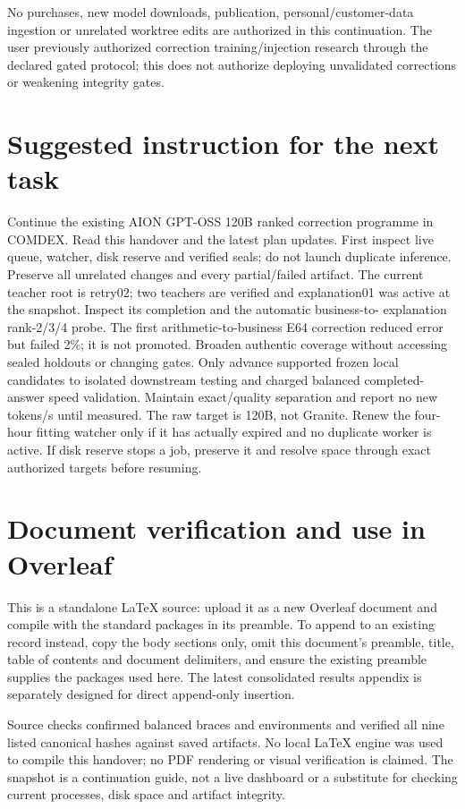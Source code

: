 \documentclass[11pt,a4paper]{article}
\begin{document}
No purchases, new model downloads, publication, personal/customer-data
ingestion or unrelated worktree edits are authorized in this continuation.
The user previously authorized correction training/injection research through
the declared gated protocol; this does not authorize deploying unvalidated
corrections or weakening integrity gates.

\section{Suggested instruction for the next task}
Continue the existing AION GPT-OSS 120B ranked correction programme in COMDEX.
Read this handover and the latest plan updates. First inspect live queue,
watcher, disk reserve and verified seals; do not launch duplicate inference.
Preserve all unrelated changes and every partial/failed artifact. The current
teacher root is retry02; two teachers are verified and explanation01 was
active at the snapshot. Inspect its completion and the automatic business-to-
explanation rank-2/3/4 probe. The first arithmetic-to-business E64 correction
reduced error but failed 2\%; it is not promoted. Broaden authentic coverage
without accessing sealed holdouts or changing gates. Only advance supported
frozen local candidates to isolated downstream testing and charged balanced
completed-answer speed validation. Maintain exact/quality separation and
report no new tokens/s until measured. The raw target is 120B, not Granite.
Renew the four-hour fitting watcher only if it has actually expired and no
duplicate worker is active. If disk reserve stops a job, preserve it and
resolve space through exact authorized targets before resuming.

\section{Document verification and use in Overleaf}
This is a standalone LaTeX source: upload it as a new Overleaf document and
compile with the standard packages in its preamble. To append to an existing
record instead, copy the body sections only, omit this document's preamble,
title, table of contents and document delimiters, and ensure the existing
preamble supplies the packages used here. The latest consolidated results
appendix is separately designed for direct append-only insertion.

Source checks confirmed balanced braces and environments and verified all nine
listed canonical hashes against saved artifacts. No local LaTeX engine was
used to compile this handover; no PDF rendering or visual verification is
claimed. The snapshot is a continuation guide, not a live dashboard or a
substitute for checking current processes, disk space and artifact integrity.
\end{document}

